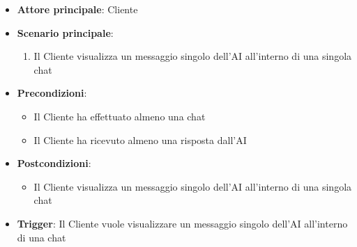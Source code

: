 \label{uc_50.1.1.1.2}

\begin{itemize}
	\item \textbf{Attore principale}: Cliente
	\item \textbf{Scenario principale}:
	\begin{enumerate}
		\item Il Cliente visualizza un messaggio singolo dell'AI all'interno di una singola chat 
	\end{enumerate}
	\item \textbf{Precondizioni}:
	\begin{itemize}
		\item Il Cliente ha effettuato almeno una chat
		\item Il Cliente ha ricevuto almeno una risposta dall'AI
	\end{itemize}
	\item \textbf{Postcondizioni}:
	\begin{itemize}
		\item Il Cliente visualizza un messaggio singolo dell'AI all'interno di una singola chat 
	\end{itemize}
	\item \textbf{Trigger}: Il Cliente vuole visualizzare un messaggio singolo dell'AI all'interno di una chat 
\end{itemize}